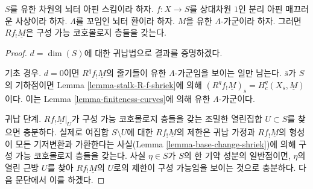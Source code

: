 \begin{lemma}
\label{lemma-constant-shriek-rel-dim-1}
$S$를 유한 차원의 뇌터 아핀 스킴이라 하자.
$f : X \to S$를 상대차원 $1$인 분리 아핀 매끄러운 사상이라 하자.
$\Lambda$를 꼬임인 뇌터 환이라 하자.
$M$을 유한 $\Lambda$-가군이라 하자.
그러면 $Rf_!\underline{M}$은 구성 가능 코호몰로지 층들을 갖는다.
\end{lemma}

\begin{proof}
$d = \dim(S)$에 대한 귀납법으로 결과를 증명하겠다.

\medskip\noindent
기초 경우. $d = 0$이면 $R^qf_!\underline{M}$의 줄기들이 유한
$\Lambda$-가군임을 보이는 일만 남는다.
$\overline{s}$가 $S$의 기하점이면 Lemma
\ref{lemma-stalk-R-f-shriek}에 의해
$(R^qf_!\underline{M})_{\overline{s}} = H^q_c(X_{\overline{s}}, \underline{M})$이다.
이는 Lemma \ref{lemma-finiteness-curves}에 의해 유한
$\Lambda$-가군이다.

\medskip\noindent
귀납 단계. $Rf_!\underline{M}|_U$가 구성 가능 코호몰로지 층들을 갖는
조밀한 열린집합 $U \subset S$를 찾으면 충분하다.
실제로 여집합 $S \setminus U$에 대한
$Rf_!\underline{M}$의 제한은 귀납 가정과 $Rf_!\underline{M}$의 형성이
모든 기저변환과 가환한다는 사실(Lemma
\ref{lemma-base-change-shriek})에 의해 구성 가능 코호몰로지 층들을
갖는다. 사실 $\eta \in S$가 $S$의 한 기약 성분의 일반점이면,
$\eta$의 열린 근방 $U$를 찾아 $Rf_!\underline{M}$의 $U$로의 제한이
구성 가능임을 보이는 것으로 충분하다. 다음 문단에서 이를 하겠다.


\end{proof}

